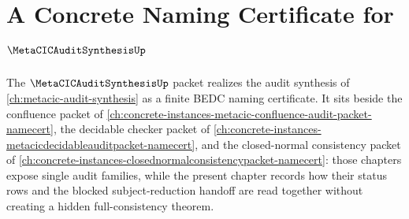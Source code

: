 \chapter{A Concrete Naming Certificate for $\MetaCICAuditSynthesisUp$}
\label{ch:concrete-instances-metacicauditsynthesis-namecert}

The $\MetaCICAuditSynthesisUp$ packet realizes the audit synthesis of \autoref{ch:metacic-audit-synthesis} as a finite BEDC naming certificate. It sits beside the confluence packet of \autoref{ch:concrete-instances-metacic-confluence-audit-packet-namecert}, the decidable checker packet of \autoref{ch:concrete-instances-metacicdecidableauditpacket-namecert}, and the closed-normal consistency packet of \autoref{ch:concrete-instances-closednormalconsistencypacket-namecert}: those chapters expose single audit families, while the present chapter records how their status rows and the blocked subject-reduction handoff are read together without creating a hidden full-consistency theorem.

